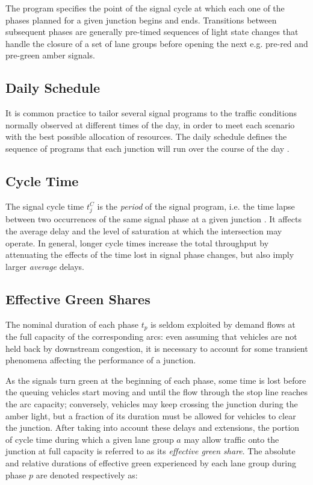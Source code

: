 The program specifies the point of the signal cycle at which each one of the phases planned for a given junction begins and ends.
Transitions between subsequent phases are generally pre-timed sequences of light state changes that handle the closure of a set of lane groups before opening the next e.g. pre-red and pre-green amber signals.

\subsection{Daily Schedule}
It is common practice to tailor several signal programs to the traffic conditions normally observed at different times of the day, in order to meet each scenario with the best possible allocation of resources. The daily schedule defines the sequence of programs that each junction will run over the course of the day .

\subsection{Cycle Time}
The signal cycle time $t^{C}_{j}$ is the \emph{period} of the signal program, i.e. the time lapse between two occurrences of the same signal phase at a given junction .
It affects the average delay and the level of saturation at which the intersection may operate. In general, longer cycle times increase the total throughput by attenuating the effects of the time lost in signal phase changes, but also imply larger \emph{average} delays.

\subsection{Effective Green Shares}
The nominal duration of each phase $t_p$ is seldom exploited by demand flows at the full capacity of the corresponding arcs: even assuming that vehicles are not held back by downstream congestion, it is necessary to account for some transient phenomena affecting the performance of a junction.

As the signals turn green at the beginning of each phase, some time is lost before the queuing vehicles start moving and until the flow through the stop line reaches the arc capacity; conversely, vehicles may keep crossing the junction during the amber light, but a fraction of its duration must be allowed for vehicles to clear the junction.
After taking into account these delays and extensions, the portion of cycle time during which a given lane group $a$ may allow traffic onto the junction at full capacity is referred to as its \emph{effective green share}.
The absolute and relative durations of effective green experienced by each lane group during phase $p$ are denoted respectively as:

